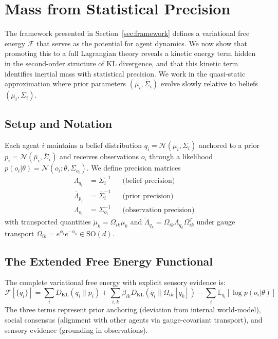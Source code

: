\documentclass[11pt]{article}
\begin{document}
\section{Mass from Statistical Precision}
\label{sec:mass}

The framework presented in Section~\ref{sec:framework} defines a variational free energy $\mathcal{F}$ that serves as the potential for agent dynamics. We now show that promoting this to a full Lagrangian theory reveals a kinetic energy term hidden in the second-order structure of KL divergence, and that this kinetic term identifies inertial mass with statistical precision. We work in the quasi-static approximation where prior parameters $(\bar{\mu}_i, \bar{\Sigma}_i)$ evolve slowly relative to beliefs $(\mu_i, \Sigma_i)$.

\subsection{Setup and Notation}

Each agent $i$ maintains a belief distribution $q_i = \mathcal{N}(\mu_i, \Sigma_i)$ anchored to a prior $p_i = \mathcal{N}(\bar{\mu}_i, \bar{\Sigma}_i)$ and receives observations $o_i$ through a likelihood $p(o_i | \theta) = \mathcal{N}(o_i; \theta, \Sigma_{o_i})$. We define precision matrices
\begin{align}
\Lambda_{q_i} &= \Sigma_i^{-1} & &\text{(belief precision)} \\
\bar{\Lambda}_{p_i} &= \bar{\Sigma}_i^{-1} & &\text{(prior precision)} \\
\Lambda_{o_i} &= \Sigma_{o_i}^{-1} & &\text{(observation precision)}
\end{align}
with transported quantities $\tilde{\mu}_k = \Omega_{ik}\mu_k$ and $\tilde{\Lambda}_{q_k} = \Omega_{ik}\Lambda_{q_k}\Omega_{ik}^T$ under gauge transport $\Omega_{ik} = e^{\phi_i}e^{-\phi_k} \in \mathrm{SO}(d)$.

\subsection{The Extended Free Energy Functional}

The complete variational free energy with explicit sensory evidence is:
\begin{equation}
\mathcal{F}[\{q_i\}] = \sum_i D_{\mathrm{KL}}(q_i \| p_i) + \sum_{i,k} \beta_{ik} D_{\mathrm{KL}}(q_i \| \Omega_{ik}[q_k]) - \sum_i \mathbb{E}_{q_i}[\log p(o_i | \theta)]
\label{eq:extended_free_energy}
\end{equation}
The three terms represent prior anchoring (deviation from internal world-model), social consensus (alignment with other agents via gauge-covariant transport), and sensory evidence (grounding in observations).
\end{document}
